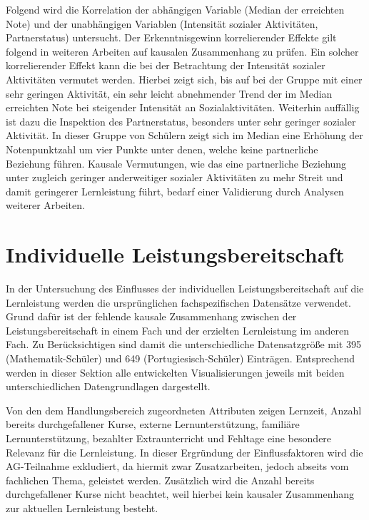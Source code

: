 Folgend wird die Korrelation der abhängigen Variable ({Median der erreichten Note}) und der unabhängigen Variablen ({Intensität sozialer Aktivitäten}, {Partnerstatus}) untersucht.
Der Erkenntnisgewinn korrelierender Effekte gilt folgend in weiteren Arbeiten auf kausalen Zusammenhang zu prüfen.
Ein solcher korrelierender Effekt kann die bei der Betrachtung der Intensität sozialer Aktivitäten vermutet werden. 
Hierbei zeigt sich, bis auf bei der Gruppe mit einer sehr geringen Aktivität, ein sehr leicht abnehmender Trend der im Median erreichten Note bei steigender Intensität an Sozialaktivitäten.
Weiterhin auffällig ist dazu die Inspektion des Partnerstatus, besonders unter sehr geringer sozialer Aktivität.
In dieser Gruppe von Schülern zeigt sich im Median eine Erhöhung der Notenpunktzahl um vier Punkte unter denen, welche keine partnerliche Beziehung führen.
Kausale Vermutungen, wie das eine partnerliche Beziehung unter zugleich geringer anderweitiger sozialer Aktivitäten zu mehr Streit und damit geringerer Lernleistung führt, bedarf einer Validierung durch Analysen weiterer Arbeiten.


\section{Individuelle Leistungsbereitschaft}

In der Untersuchung des Einflusses der individuellen Leistungsbereitschaft auf die Lernleistung werden die ursprünglichen fachspezifischen Datensätze verwendet.
Grund dafür ist der fehlende kausale Zusammenhang zwischen der Leistungsbereitschaft in einem Fach und der erzielten Lernleistung im anderen Fach.
Zu Berücksichtigen sind damit die unterschiedliche Datensatzgröße mit 395 (Mathematik-Schüler) und 649 (Portugiesisch-Schüler) Einträgen.
Entsprechend werden in dieser Sektion alle entwickelten Visualisierungen jeweils mit beiden unterschiedlichen Datengrundlagen dargestellt.

Von den dem Handlungsbereich zugeordneten Attributen zeigen Lernzeit, Anzahl bereits durchgefallener Kurse, externe Lernunterstützung, familiäre Lernunterstützung, bezahlter Extraunterricht und Fehltage eine besondere Relevanz für die Lernleistung. 
In dieser Ergründung der Einflussfaktoren wird die AG-Teilnahme exkludiert, da hiermit zwar Zusatzarbeiten, jedoch abseits vom fachlichen Thema, geleistet werden.
Zusätzlich wird die Anzahl bereits durchgefallener Kurse nicht beachtet, weil hierbei kein kausaler Zusammenhang zur aktuellen Lernleistung besteht.
\clearpage

